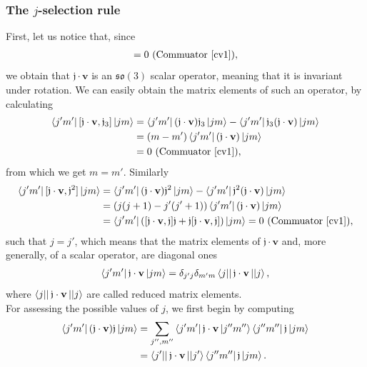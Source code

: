 \documentclass[12pt,a4paper]{report}
\theoremstyle{definition}
\theoremstyle{remark}
\theoremstyle{remark}
\begin{document}
\subsubsection{The $j$-selection rule}
First, let us notice that, since
\begin{align*}
[\mathfrak{j}\cdot\mathbf{v},\mathfrak{j}]=0 \text{ (Commuator~\ref{cv1})},
\end{align*}
we obtain that $\mathfrak{j}\cdot\mathbf{v}$ is an $\mathfrak{so}(3)$ scalar operator, meaning that it is invariant under rotation. We can easily obtain the matrix elements of such an operator, by calculating
\begin{align*}
\bra{j'm'}[\mathfrak{j}\cdot\mathbf{v},\mathfrak{j}_3]\ket{jm}&=\bra{j'm'}(\mathfrak{j}\cdot\mathbf{v})\mathfrak{j}_3\ket{jm}-\bra{j'm'}\mathfrak{j}_3(\mathfrak{j}\cdot\mathbf{v})\ket{jm}\\
&=(m-m')\bra{j'm'}(\mathfrak{j}\cdot\mathbf{v})\ket{jm}\\
&=0 \text{ (Commuator~\ref{cv1})},
\end{align*}
from which we get $m=m'$. Similarly
\begin{align*}
\bra{j'm'}[\mathfrak{j}\cdot\mathbf{v},\mathfrak{j}^2]\ket{jm}&=\bra{j'm'}(\mathfrak{j}\cdot\mathbf{v})\mathfrak{j}^2\ket{jm}-\bra{j'm'}\mathfrak{j}^2(\mathfrak{j}\cdot\mathbf{v})\ket{jm}\\
&=(j(j+1)-j'(j'+1))\bra{j'm'}(\mathfrak{j}\cdot\mathbf{v})\ket{jm}\\
&=\bra{j'm'}([\mathfrak{j}\cdot\mathbf{v},\mathfrak{j}]\mathfrak{j}+\mathfrak{j}[\mathfrak{j}\cdot\mathbf{v},\mathfrak{j}])\ket{jm}=0 \text{ (Commuator~\ref{cv1})},
\end{align*}
such that $j=j'$, which means that the matrix elements of $\mathfrak{j}\cdot\mathbf{v}$ and, more generally, of a scalar operator, are diagonal ones
\begin{align*}
\bra{j'm'}\mathfrak{j}\cdot\mathbf{v}\ket{jm}=\delta_{j'j}\delta_{m'm}\bra{j|}\mathfrak{j}\cdot\mathbf{v}\ket{|j},
\end{align*}
where $\bra{j|}\mathfrak{j}\cdot\mathbf{v}\ket{|j}$ are called reduced matrix elements. \\ \indent
For assessing the possible values of $j$, we first begin by computing
\begin{equation}\label{eso3.12}
\begin{aligned}
\bra{j'm'}(\mathfrak{j}\cdot\mathbf{v})\mathfrak{j}\ket{jm}&=\sum_{j'',m''}\bra{j'm'}\mathfrak{j}\cdot\mathbf{v}\ket{j''m''}\bra{j''m''}\mathfrak{j}\ket{jm}\\
&=\bra{j'|}\mathfrak{j}\cdot\mathbf{v}\ket{|j'}\bra{j''m''}\mathfrak{j}\ket{jm}.
\end{aligned}
\end{equation}
\end{document}
